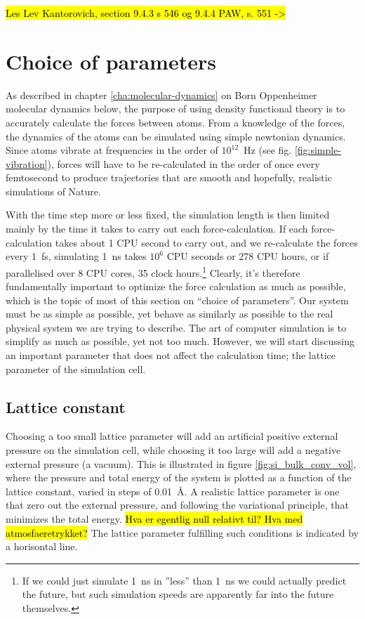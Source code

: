 \documentclass[11pt,bibliography=totoc,index=totoc]{scrbook}   %
\newcommand{\comment}[1]{\hl{#1}}
\begin{document}
\comment{Les Lev Kantorovich, section 9.4.3 s 546 og 9.4.4 PAW, s. 551 ->}

\section{Choice of parameters}\label{sec:parameters}

As described in chapter \ref{cha:molecular-dynamics} on Born Oppenheimer molecular dynamics below, the purpose of using density functional theory is to accurately calculate the forces between atoms. 
From a knowledge of the forces, the dynamics of the atoms can be simulated using simple newtonian dynamics.
Since atoms vibrate at frequencies in the order of $10^{12}$~Hz (see fig. \ref{fig:simple-vibration}), 
forces will have to be re-calculated in the order of once every femtosecond to produce trajectories that are smooth and hopefully, realistic simulations of Nature.

With the time step more or less fixed, the simulation length is then limited mainly by the time it takes to carry out each force-calculation.
If each force-calculation takes about 1 CPU second to carry out, and we re-calculate the forces every 1~fs, simulating 1~ns takes $10^6$ CPU seconds or 278 CPU hours, or if parallelised over 8 CPU cores, 35 clock hours.\footnote{If we could just simulate 1~ns in ''less'' than 1~ns we could actually predict the future, but such simulation speeds are apparently far into the future themselves.}
Clearly, it's therefore fundamentally important to optimize the force calculation as much as possible, which is the topic of most of this section on ``choice of parameters''.
Our system must be as simple as possible, yet behave as similarly as possible to the real physical system we are trying to describe. 
The art of computer simulation is to simplify as much as possible, yet not too much.
However, we will start discussing an important parameter that does not affect the calculation time; the lattice parameter of the simulation cell.

\subsection{Lattice constant}\label{sec:parameters:a}

Choosing a too small lattice parameter will add an artificial positive external pressure on the simulation cell, while choosing it too large
will add a negative external pressure (a vacuum).
This is illustrated in figure \ref{fig:si_bulk_conv_vol}, where the pressure and total energy of the system is plotted as a function of the lattice constant, varied in steps of 0.01~Å. 
A realistic lattice parameter is one that zero out the external pressure, and following the variational principle, that minimizes the total energy. 
\comment{Hva er egentlig null relativt til? Hva med atmosfaeretrykket?}
The lattice parameter fulfilling such conditions is indicated by a horisontal line.
\end{document}

